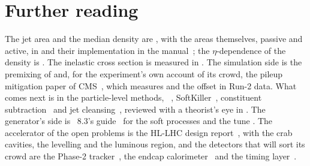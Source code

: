 \section{Further reading}
\label{sec:crowd_on_the_road:further_reading}
The jet area and the median density are \cite{Cacciari:2007fd}, with the
areas themselves, passive and active, in \cite{Cacciari:2008gn} and their
implementation in the \FASTJET manual~\cite{Cacciari:2011ma}; the
$\eta$-dependence of the density is \cite{Cacciari:2009dp}. The
inelastic cross section is measured in
\cite{ATLAS:2016ygv,CMS:2018mlc,TOTEM:2017asr}.
The simulation side is the \CMSSW premixing of \cite{Hildreth:2017caz}
and, for the experiment's own account of its crowd, the pileup
mitigation paper of CMS~\cite{CMS:2020ebo}, which measures \rhoPU and the
offset in Run-2 data. What comes next is in the particle-level methods,
\PUPPI~\cite{Bertolini:2014bba}, SoftKiller~\cite{Cacciari:2014gra},
constituent subtraction~\cite{Berta:2014eza} and jet
cleansing~\cite{Krohn:2013lba}, reviewed with a theorist's eye in
\cite{Soyez:2018opl}. The generator's side is \PYTHIA~8.3's
guide~\cite{Bierlich:2022pfr} for the soft processes and the tune
\cite{CMS:2019csb}. The accelerator of the open problems is the HL-LHC
design report~\cite{Apollinari:2017lhl}, with the crab cavities, the
levelling and the luminous region, and the detectors that will sort its
crowd are the Phase-2 tracker~\cite{CMS:2017lum}, the endcap
calorimeter~\cite{CMS:2017jpq} and the timing layer~\cite{Butler:2019rpu}.

